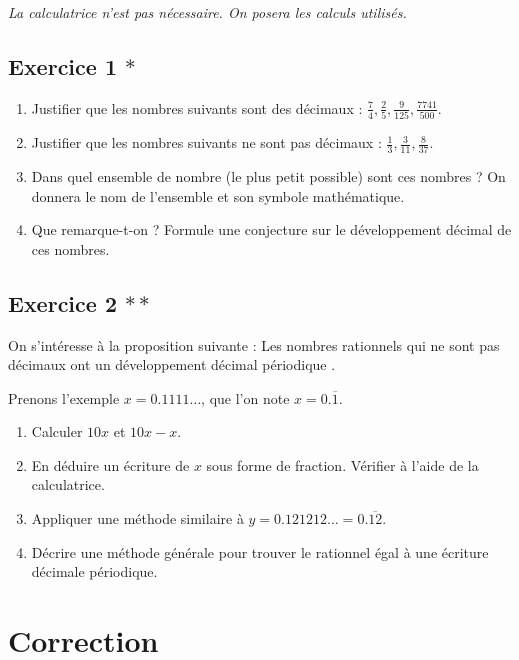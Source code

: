 \documentclass[a4paper,12pt, french, noSujetB]{article}
\date{septembre 2026}
\begin{document}
\emph{La calculatrice n'est pas nécessaire. On posera les calculs utilisés.}

\vspace{-3mm}

\subsection*{Exercice 1 $\ast$}
\begin{enumerate}
    \item Justifier que les nombres suivants sont des décimaux : $\frac{7}{4}, \frac{2}{5}, \frac{9}{125}, \frac{7741}{500}$.
    \item Justifier que les nombres suivants ne sont pas décimaux : $\frac{1}{3}, \frac{3}{11},  \frac{8}{37}$.
    \item Dans quel ensemble de nombre (le plus petit possible) sont ces nombres ? On donnera le nom de l'ensemble et son symbole mathématique.
    \item Que remarque-t-on ? Formule une conjecture sur le développement décimal de ces nombres.
\end{enumerate}

\subsection*{Exercice 2 $\ast\ast$}
On s'intéresse à la proposition suivante : \guillemotleft Les nombres rationnels qui ne sont pas décimaux ont un développement décimal périodique \guillemotright.

Prenons l'exemple $x = 0.1111\dots$, que l'on note $x = 0.\overline{1}$.
\begin{enumerate}
    \item Calculer $10x$ et $10x-x$.
    \item En déduire un écriture de $x$ sous forme de fraction. Vérifier à l'aide de la calculatrice.
    \item Appliquer une méthode similaire à $y=0.121212\dots=0.\overline{12}$.
    \item Décrire une méthode générale pour trouver le rationnel égal à une écriture décimale périodique.
\end{enumerate}

\newpage
\section*{Correction}
\vspace{-3mm}
\end{document}
